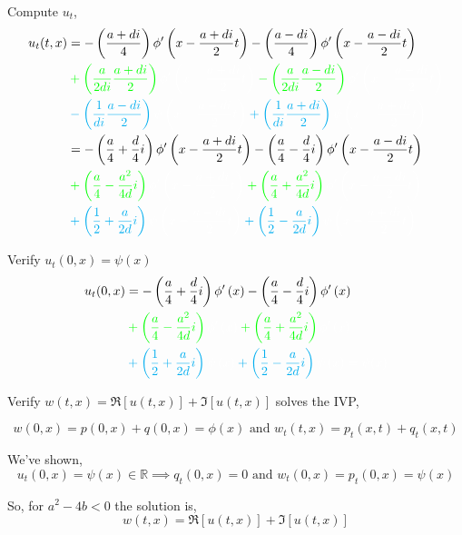 \documentclass{article}
\newcommand\R{\mathbb{R}}
\begin{document}
Compute $u_t$,
\begin{align*}
  u_t(t,x)
  &= -\left(\frac{a+di}{4}\right) \phi'\left(x - \frac{a+di}{2}t
    \right)- \left(\frac{a-di}{4}\right)  \phi'\left(x -\frac{a-di}{2}t \right)\\
  &\color{green}+\left(  \frac{a}{2di}\frac{a+di}{2}\right)\color{white} \phi'\left(x
    -\frac{a+di}{2}t \right)
    \color{green}-\left(\frac{a}{2di}\frac{a-di}{2}\right)\color{white}\phi'\left(x
    -\frac{a-di}{2}t \right)
    \\
  &\color{cyan}-\left(  \frac{1}{di}\frac{a-di}{2}\right)\color{white}\psi\left(x -
    \frac{a-di}{2}t \right)\color{cyan}
  +\left(  \frac{1}{di}\frac{a+di}{2}\right)\color{white}\psi\left(x -
    \frac{a+di}{2}t \right)\\
  &= -\left(\frac{a}{4}+\frac{d}{4}i\right) \phi'\left(x - \frac{a+di}{2}t
    \right)- \left(\frac{a}{4}-\frac{d}{4}i\right)  \phi'\left(x -\frac{a-di}{2}t \right)\\
  &\color{green}+\left(\frac{a}{4}-\frac{a^2}{4d}i\right) \color{white}\phi'\left(x
    -\frac{a+di}{2}t \right)  \color{green}
    +\left(\frac{a}{4} +\frac{a^2}{4d}i\right)\color{white}\phi'\left(x
    -\frac{a-di}{2}t \right)
    \\
  &\color{cyan}+\left(  \frac{1}{2}+\frac{a}{2d}i\right)\color{white}\psi\left(x -
    \frac{a-di}{2}t \right) \color{cyan}
  +\left(  \frac{1}{2}-\frac{a}{2d}i\right)\color{white}\psi\left(x -
    \frac{a+di}{2}t \right)
\end{align*}

Verify $u_t(0,x) = \psi(x)$
\begin{align*}
  u_t(0,x)&= -\left(\frac{a}{4}+\frac{d}{4}i\right) \phi'\left(x
            \right)- \left(\frac{a}{4}-\frac{d}{4}i\right)  \phi'\left(x  \right)\\
  &\color{green}+\left(\frac{a}{4}-\frac{a^2}{4d}i\right) \color{white}\phi'\left(x
     \right)  \color{green}
    +\left(\frac{a}{4} +\frac{a^2}{4d}i\right)\color{white}\phi'\left(x
     \right)
    \\
  &\color{cyan}+\left(  \frac{1}{2}+\frac{a}{2d}i\right)\color{white}\psi\left(x  \right) \color{cyan}
  +\left(  \frac{1}{2}-\frac{a}{2d}i\right)\color{white}\psi\left(x
    \right) = \psi(x)
\end{align*}

Verify $w(t,x) = \Re[u(t,x)] + \Im[u(t,x)]$ solves the IVP,

\[w(0,x) = p(0,x)+q(0,x) = \phi(x) \text{ and } w_t(t,x) = p_t(x,t) + q_t(x,t)\]

We've shown,
\[u_t(0,x) = \psi(x) \in \R \implies q_t(0,x) = 0 \text{ and } w_t(0,x) = p_t(0,x) = \psi(x)\]

So, for $a^2-4b<0$ the solution is, \[w(t,x) = \Re[u(t,x)] +
  \Im[u(t,x)]\]
\end{document}
